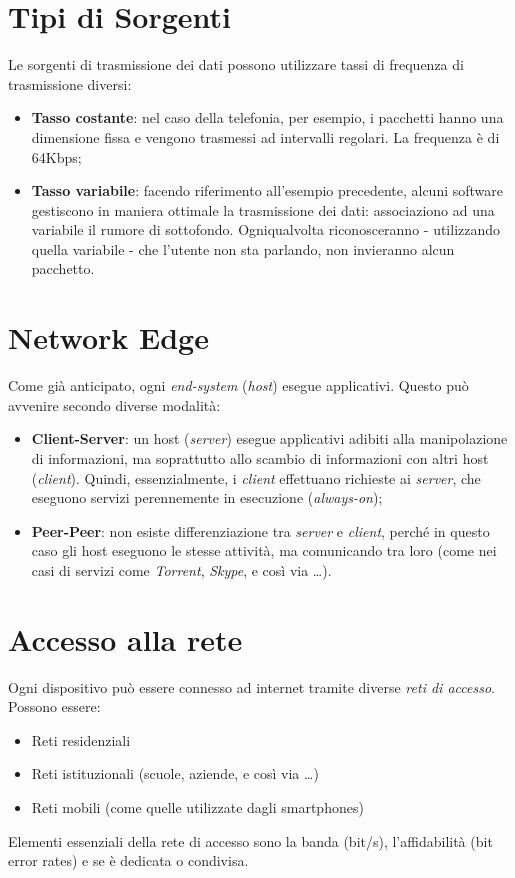 \section{Tipi di Sorgenti}
Le sorgenti di trasmissione dei dati possono utilizzare tassi di frequenza di trasmissione diversi:
\begin{itemize}
    \item \textbf{Tasso costante}: nel caso della telefonia, per esempio, i pacchetti hanno una dimensione fissa e vengono trasmessi ad intervalli regolari. La frequenza è di 64Kbps;
    \item \textbf{Tasso variabile}: facendo riferimento all'esempio precedente, alcuni software gestiscono in maniera ottimale la trasmissione dei dati: associaziono ad una variabile il rumore di sottofondo. Ogniqualvolta riconosceranno - utilizzando quella variabile - che l'utente non sta parlando, non invieranno alcun pacchetto.
\end{itemize}

\section{Network Edge}
Come già anticipato, ogni \textit{end-system} (\textit{host}) esegue applicativi. Questo può avvenire secondo diverse modalità:
\begin{itemize}
	\item \textbf{Client-Server}: un host (\textit{server}) esegue applicativi adibiti alla manipolazione di informazioni, ma soprattutto allo scambio di informazioni con altri host (\textit{client}). Quindi, essenzialmente, i \textit{client} effettuano richieste ai \textit{server}, che eseguono servizi perennemente in esecuzione (\textit{always-on});
	\item \textbf{Peer-Peer}: non esiste differenziazione tra \textit{server} e \textit{client}, perché in questo caso gli host eseguono le stesse attività, ma comunicando tra loro (come nei casi di servizi come \textit{Torrent}, \textit{Skype}, e così via \ldots).
\end{itemize}

\section{Accesso alla rete}
Ogni dispositivo può essere connesso ad internet tramite diverse \textit{reti di accesso}. Possono essere:
\begin{itemize}
	\item Reti residenziali
	\item Reti istituzionali (scuole, aziende, e così via \ldots)
	\item Reti mobili (come quelle utilizzate dagli smartphones)
\end{itemize}
Elementi essenziali della rete di accesso sono la banda (bit/s), l'affidabilità (bit error rates) e se è dedicata o condivisa.

